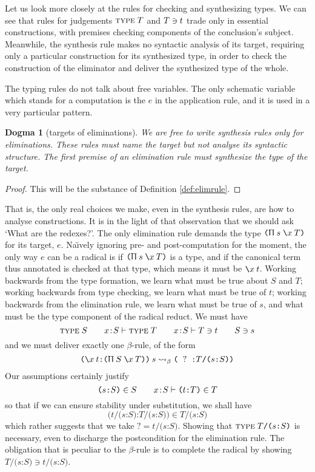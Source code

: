\documentclass{jfp1}
\newtheorem{dogma}[theorem]{Dogma}
\newcommand{\fsl}{\texttt{/}}
\newcommand{\Pa}[1]{\texttt{(}#1\texttt{)}}
\newcommand{\hb}{\texttt{:}}
\newcommand{\ra}[2]{\Pa{#1 \hb #2}}
\begin{document}
Let us look more closely at the rules for checking and synthesizing types. We can see that
rules for judgements $\textsc{type}\;T$ and $T \ni t$ trade only in essential constructions,
with premises checking components of the conclusion's subject. Meanwhile, the synthesis
rule makes no syntactic analysis of its target, requiring only a particular construction
for its synthesized type, in order to check the construction of the eliminator
and deliver the synthesized type of the whole.

The typing rules do not talk about free variables. The only schematic variable
which stands for a computation is the $e$ in the application rule, and it is used in a
very particular pattern.

\begin{dogma}[targets of eliminations]
  We are free to write synthesis rules only for eliminations. These rules must
  name the target but not analyse its syntactic structure. The first premise
  of an elimination rule must synthesize the type of the target.
\end{dogma}
\begin{proof}
  This will be the substance of Definition \ref{def:elimrule}.
\end{proof}

That is, the only real choices we make, even in the synthesis rules, are how to
analyse constructions. It is in the light of that observation that we
should ask `What are the redexes?'. The only elimination rule demands
the type $\PI sxT$ for its target, $e$. Na\"\i{}vely ignoring pre- and post-computation
for the moment, the only way $e$ can be a radical is if $\PI sxT$ is a
type, and if the canonical term thus annotated is checked at that
type, which means it must be $\la xt$. Working backwards from the type
formation, we learn what must be true about $S$ and $T$; working
backwards from type checking, we learn what must be true of $t$;
working backwards from the elimination rule, we learn what must be
true of $s$, and what must be the type component of the radical
reduct. We must have
\[
  \textsc{type}\;S \qquad x\!:\!S\vdash\textsc{type}\;T\qquad x\!:\!S\vdash T\ni t \qquad S\ni s
\]
and we must deliver exactly one $\beta$-rule, of the form
\[
  \ra{\la xt}{\PI SxT}\:s \leadsto_\beta \ra{\;\;?\;\;}{T\fsl\ra sS}
\]
Our assumptions certainly justify
\[
  \ra sS \in S \qquad \cxe xS \ra tT \in T
\]
so that if we can ensure stability under substitution, we shall have
\[
   \ra{t\fsl\ra sS}{T\fsl\ra sS} \in T\fsl\ra sS
\]
which rather suggests that we take $?=t\fsl\ra sS$. Showing that
$\ty T\fsl\ra sS$ is necessary, even to discharge the postcondition
for the elimination rule. The obligation that is peculiar to the
$\beta$-rule is to complete the radical by showing $T\fsl\ra sS\ni
t\fsl\ra sS$.
\end{document}
